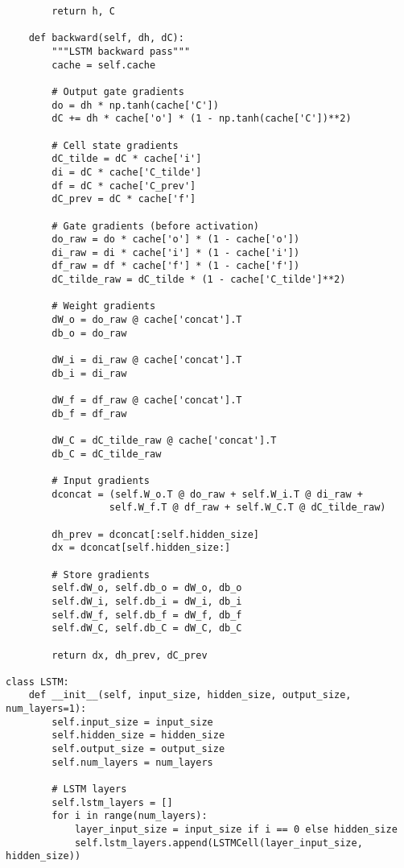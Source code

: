 ﻿\documentclass[12pt,a4paper]{article}
\begin{document}
\begin{lstlisting}
        return h, C
    
    def backward(self, dh, dC):
        """LSTM backward pass"""
        cache = self.cache
        
        # Output gate gradients
        do = dh * np.tanh(cache['C'])
        dC += dh * cache['o'] * (1 - np.tanh(cache['C'])**2)
        
        # Cell state gradients
        dC_tilde = dC * cache['i']
        di = dC * cache['C_tilde']
        df = dC * cache['C_prev']
        dC_prev = dC * cache['f']
        
        # Gate gradients (before activation)
        do_raw = do * cache['o'] * (1 - cache['o'])
        di_raw = di * cache['i'] * (1 - cache['i'])
        df_raw = df * cache['f'] * (1 - cache['f'])
        dC_tilde_raw = dC_tilde * (1 - cache['C_tilde']**2)
        
        # Weight gradients
        dW_o = do_raw @ cache['concat'].T
        db_o = do_raw
        
        dW_i = di_raw @ cache['concat'].T
        db_i = di_raw
        
        dW_f = df_raw @ cache['concat'].T
        db_f = df_raw
        
        dW_C = dC_tilde_raw @ cache['concat'].T
        db_C = dC_tilde_raw
        
        # Input gradients
        dconcat = (self.W_o.T @ do_raw + self.W_i.T @ di_raw +
                  self.W_f.T @ df_raw + self.W_C.T @ dC_tilde_raw)
        
        dh_prev = dconcat[:self.hidden_size]
        dx = dconcat[self.hidden_size:]
        
        # Store gradients
        self.dW_o, self.db_o = dW_o, db_o
        self.dW_i, self.db_i = dW_i, db_i
        self.dW_f, self.db_f = dW_f, db_f
        self.dW_C, self.db_C = dW_C, db_C
        
        return dx, dh_prev, dC_prev

class LSTM:
    def __init__(self, input_size, hidden_size, output_size, num_layers=1):
        self.input_size = input_size
        self.hidden_size = hidden_size
        self.output_size = output_size
        self.num_layers = num_layers
        
        # LSTM layers
        self.lstm_layers = []
        for i in range(num_layers):
            layer_input_size = input_size if i == 0 else hidden_size
            self.lstm_layers.append(LSTMCell(layer_input_size, hidden_size))
        

\end{lstlisting}
\end{document}
